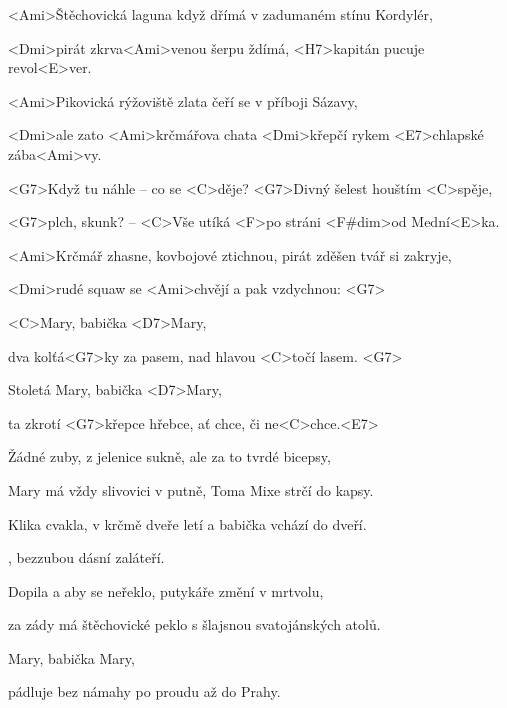 

\zs
<Ami>Štěchovická laguna když dřímá v zadumaném stínu Kordylér, 

<Dmi>pirát zkrva<Ami>venou šerpu ždímá, <H7>kapitán pucuje revol<E>ver. 

\bigskip

<Ami>Pikovická rýžoviště zlata čeří se v příboji Sázavy, 

<Dmi>ale zato <Ami>krčmářova chata <Dmi>křepčí rykem <E7>chlapské zába<Ami>vy. 

\bigskip

<G7>Když tu náhle -- co se <C>děje? <G7>Divný šelest houštím <C>spěje, 

<G7>plch, skunk? -- <C>Vše utíká <F>po stráni <F#dim>od Mední<E>ka. 

\bigskip

<Ami>Krčmář zhasne, kovbojové ztichnou, pirát zděšen tvář si zakryje, 

<Dmi>rudé squaw se <Ami>chvějí a pak vzdychnou:
<G7> \ks

\zr
<C>Mary, babička <D7>Mary, 

dva kolťá<G7>ky za pasem, nad hlavou <C>točí lasem. <G7>

Stoletá Mary, babička <D7>Mary, 

ta zkrotí <G7>křepce hřebce, ať chce, či ne<C>chce.<E7> 
\kr

\zs
Žádné zuby, z jelenice sukně, ale za to tvrdé bicepsy, 

Mary má vždy slivovici v putně, Toma Mixe strčí do kapsy. 

\bigskip

Klika cvakla, v krčmě dveře letí a babička vchází do dveří.

, bezzubou dásní zaláteří. 

\bigskip


\bigskip

Dopila a aby se neřeklo, putykáře změní v mrtvolu, 

za zády má štěchovické peklo s šlajsnou svatojánských atolů. 
\ks

\zr
Mary, babička Mary, 

pádluje bez námahy po proudu až do Prahy. 

